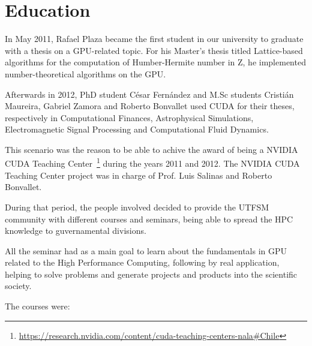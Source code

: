 \section{Education}

In May 2011, Rafael Plaza became the first student in our university
to graduate with a thesis on a GPU-related topic.
For his Master's thesis titled Lattice-based algorithms for the computation of
Humber-Hermite number in Z, he implemented number-theoretical algorithms on the GPU.

Afterwards in 2012, PhD student César Fernández and M.Sc students Cristián Maureira,
Gabriel Zamora and Roberto Bonvallet used CUDA for their theses,
respectively in Computational Finances, Astrophysical Simulations,
Electromagnetic Signal Processing and Computational Fluid Dynamics.

This scenario was the reason to be able to achive the award of being a
NVIDIA CUDA Teaching Center~\footnote{\url{https://research.nvidia.com/content/cuda-teaching-centers-nala\#Chile}} during the years 2011 and 2012.
The NVIDIA CUDA Teaching Center project was in charge of Prof. Luis Salinas
and Roberto Bonvallet.

During that period,
the people involved decided to provide the UTFSM community
with different courses and seminars, being able to spread the HPC knowledge
to guvernamental divisions.

All the seminar had as a main goal to learn about the fundamentals in GPU related
to the High Performance Computing, following by real application,
helping to solve problems and generate projects and products into the
scientific society.

The courses were:

